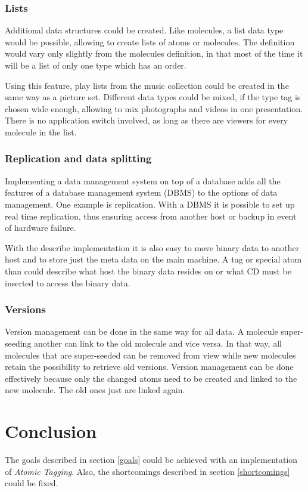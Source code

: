 \documentclass[12pt,a4paper,notitlepage,twocolumn,oneside]{article}
\newcommand{\at}{{\emph{Atomic Tagging}}}
\begin{document}
\subsubsection{Lists}
Additional data structures could be created. Like molecules, a list data type would be possible, allowing to create lists of atoms or molecules. The definition would vary only slightly from the molecules definition, in that most of the time it will be a list of only one type which has an order.

Using this feature, play lists from the music collection could be created in the same way as a picture set. Different data types could be mixed, if the type tag is chosen wide enough, allowing to mix photographs and videos in one presentation. There is no application switch involved, as long as there are viewers for every molecule in the list.

\subsubsection{Replication and data splitting}
Implementing a data management system on top of a database adds all the features of a database management system (DBMS) to the options of data management. One example is replication. With a DBMS it is possible to set up real time replication, thus ensuring access from another host or backup in event of hardware failure.

With the describe implementation it is also easy to move binary data to another host and to store just the meta data on the main machine. A tag or special atom than could describe what host the binary data resides on or what CD must be inserted to access the binary data.

\subsubsection{Versions}
Version management can be done in the same way for all data. A molecule super-seeding another can link to the old molecule and vice versa. In that way, all molecules that are super-seeded can be removed from view while new molecules retain the possibility to retrieve old versions. Version management can be done effectively because only the changed atoms need to be created and linked to the new molecule. The old ones just are linked again.



\section{Conclusion}
The goals described in section \ref{goals} could be achieved with an implementation of \at{.} Also, the shortcomings described in section \ref{shortcomings} could be fixed. 
\end{document}
